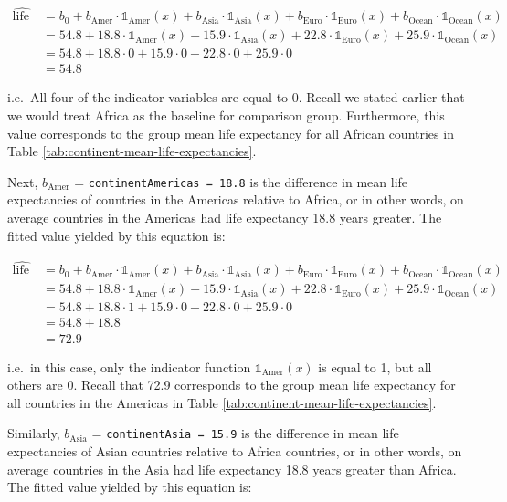\documentclass[12pt,]{krantz}
\begin{document}
\begin{align}
\widehat{\text{life exp}} &= b_0 + b_{\text{Amer}}\cdot\mathbb{1}_{\mbox{Amer}}(x) + b_{\text{Asia}}\cdot\mathbb{1}_{\mbox{Asia}}(x)
+ b_{\text{Euro}}\cdot\mathbb{1}_{\mbox{Euro}}(x) + b_{\text{Ocean}}\cdot\mathbb{1}_{\mbox{Ocean}}(x)\\
&= 54.8 + 18.8\cdot\mathbb{1}_{\mbox{Amer}}(x) + 15.9\cdot\mathbb{1}_{\mbox{Asia}}(x)
+ 22.8\cdot\mathbb{1}_{\mbox{Euro}}(x) + 25.9\cdot\mathbb{1}_{\mbox{Ocean}}(x)\\
&= 54.8 + 18.8\cdot 0 + 15.9\cdot 0 + 22.8\cdot 0 + 25.9\cdot 0\\
&= 54.8
\end{align}

i.e.~All four of the indicator variables are equal to 0. Recall we
stated earlier that we would treat Africa as the baseline for comparison
group. Furthermore, this value corresponds to the group mean life
expectancy for all African countries in Table
\ref{tab:continent-mean-life-expectancies}.

Next, \(b_{\text{Amer}}\) = \texttt{continentAmericas\ =\ 18.8} is the
difference in mean life expectancies of countries in the Americas
relative to Africa, or in other words, on average countries in the
Americas had life expectancy 18.8 years greater. The fitted value
yielded by this equation is:

\begin{align}
\widehat{\text{life exp}} &= b_0 + b_{\text{Amer}}\cdot\mathbb{1}_{\mbox{Amer}}(x) + b_{\text{Asia}}\cdot\mathbb{1}_{\mbox{Asia}}(x)
+ b_{\text{Euro}}\cdot\mathbb{1}_{\mbox{Euro}}(x) + b_{\text{Ocean}}\cdot\mathbb{1}_{\mbox{Ocean}}(x)\\
&= 54.8 + 18.8\cdot\mathbb{1}_{\mbox{Amer}}(x) + 15.9\cdot\mathbb{1}_{\mbox{Asia}}(x)
+ 22.8\cdot\mathbb{1}_{\mbox{Euro}}(x) + 25.9\cdot\mathbb{1}_{\mbox{Ocean}}(x)\\
&= 54.8 + 18.8\cdot 1 + 15.9\cdot 0 + 22.8\cdot 0 + 25.9\cdot 0\\
&= 54.8 + 18.8\\
&= 72.9
\end{align}

i.e.~in this case, only the indicator function
\(\mathbb{1}_{\mbox{Amer}}(x)\) is equal to 1, but all others are 0.
Recall that 72.9 corresponds to the group mean life expectancy for all
countries in the Americas in Table
\ref{tab:continent-mean-life-expectancies}.

Similarly, \(b_{\text{Asia}}\) = \texttt{continentAsia\ =\ 15.9} is the
difference in mean life expectancies of Asian countries relative to
Africa countries, or in other words, on average countries in the Asia
had life expectancy 18.8 years greater than Africa. The fitted value
yielded by this equation is:
\end{document}
